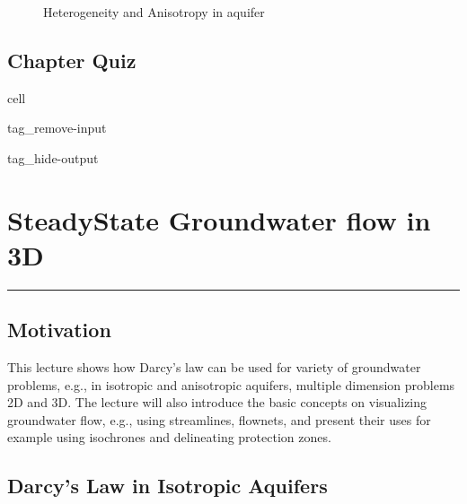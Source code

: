 \documentclass[letterpaper,10pt,english]{jupyterBook}
\begin{document}
\begin{figure}[htbp]
\centering
\capstart

\noindent{}
\caption{Heterogeneity and Anisotropy in aquifer}\label{\detokenize{content/flow/L5/15_het_iso:het-aniso}}\end{figure}


\section{Chapter Quiz}
\label{\detokenize{content/flow/L5/15_het_iso:chapter-quiz}}
\begin{sphinxuseclass}{cell}
\begin{sphinxuseclass}{tag_remove-input}
\begin{sphinxuseclass}{tag_hide-output}
\end{sphinxuseclass}
\end{sphinxuseclass}
\end{sphinxuseclass}
\sphinxstepscope


\chapter{Steady\sphinxhyphen{}State Groundwater flow in 3D}
\label{\detokenize{content/flow/L6/16_darcy_law_3D:steady-state-groundwater-flow-in-3d}}\label{\detokenize{content/flow/L6/16_darcy_law_3D::doc}}
\sphinxAtStartPar
{}


\bigskip\hrule\bigskip



\section{Motivation}
\label{\detokenize{content/flow/L6/16_darcy_law_3D:motivation}}
\sphinxAtStartPar
This lecture shows how Darcy’s law can be used for variety of groundwater problems, e.g., in isotropic and anisotropic aquifers, multiple dimension problems \sphinxhyphen{} 2D and 3D. The lecture will also introduce the basic concepts on visualizing groundwater flow, e.g., using streamlines, flow\sphinxhyphen{}nets, and present their uses for example using isochrones and delineating protection zones.


\section{Darcy’s Law in Isotropic Aquifers}
\label{\detokenize{content/flow/L6/16_darcy_law_3D:darcy-s-law-in-isotropic-aquifers}}
\end{document}
